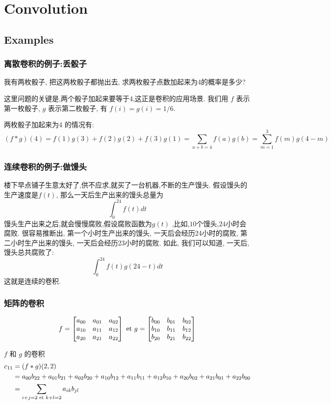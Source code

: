 \chapter{Convolution}
\section{Examples}
\subsection{离散卷积的例子:丢骰子}
我有两枚骰子, 把这两枚骰子都抛出去, 求两枚骰子点数加起来为4的概率是多少?

这里问题的关键是,两个骰子加起来要等于4,这正是卷积的应用场景.
我们用 $f$ 表示第一枚骰子, $g$ 表示第二枚骰子, 有 $f(i) = g(i) = 1/6$.

两枚骰子加起来为4 的情况有:
$$(f * g)(4) = f(1)g(3) + f(2)g(2) + f(3)g(1) = \sum_{a + b = 4}f(a)g(b) = \sum_{m = 1}^3f(m)g(4 - m)$$

\subsection{连续卷积的例子:做馒头}
楼下早点铺子生意太好了,供不应求,就买了一台机器,不断的生产馒头.
假设馒头的生产速度是$f(t)$, 那么一天后生产出来的馒头总量为$$\int_0^{24} f(t)dt$$
馒头生产出来之后,就会慢慢腐败,假设腐败函数为$g(t)$ ,比如,$10$个馒头,$24$小时会腐败.
很容易推断出, 第一个小时生产出来的馒头, 一天后会经历24小时的腐败, 第二小时生产出来的馒头, 一天后会经历23小时的腐败.
如此, 我们可以知道, 一天后, 馒头总共腐败了:
$$\int_0^{24} f(t)g(24 - t)dt$$
这就是连续的卷积.

\subsection{矩阵的卷积}
$$
f =
\begin{bmatrix}
a_{00} & a_{01} & a_{02} \\
a_{10} & a_{11} & a_{12} \\
a_{20} & a_{21} & a_{22} \\
\end{bmatrix}
\textrm{\ et }
g =
\begin{bmatrix}
b_{00} & b_{01} & b_{02} \\
b_{10} & b_{11} & b_{12} \\
b_{20} & b_{21} & b_{22} \\
\end{bmatrix}
$$

$f$ 和 $g$ 的卷积
$$
\begin{aligned}
c_{11}
& = (f * g)(2, 2) \\
& = a_{00}b_{22} + a_{01}b_{21} + a_{02}b_{20} + a_{10}b_{12} + a_{11}b_{11} + a_{12}b_{10} + a_{20}b_{02} + a_{21}b_{01} + a_{22}b_{00} \\
& = \sum_{i + j = 2 \textrm{\ et } k + l = 2}a_{ik}b_{jl}
\end{aligned}
$$

